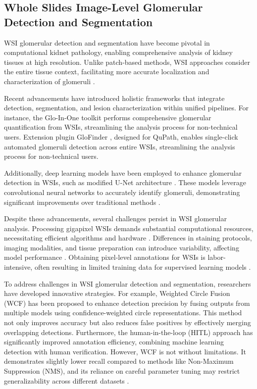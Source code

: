     \subsection{Whole Slides Image-Level Glomerular Detection and Segmentation}

WSI glomerular detection and segmentation have become pivotal in computational kidnet pathology, enabling comprehensive analysis of kidney tissues at high resolution. Unlike patch-based methods, WSI approaches consider the entire tissue context, facilitating more accurate localization and characterization of glomeruli \citep{BUENO2020105273, tang2024holohisto}. 

Recent advancements have introduced holistic frameworks that integrate detection, segmentation, and lesion characterization within unified pipelines. For instance, the Glo-In-One \citep{GloInOne, GloInOne_v2} toolkit performs comprehensive glomerular quantification from WSIs, streamlining the analysis process for non-technical users. Extension plugin GloFinder \citep{GloFinder}, designed for QuPath, enables single-click automated glomeruli detection across entire WSIs, streamlining the analysis process for non-technical users.

Additionally, deep learning models have been employed to enhance glomerular detection in WSIs, such as modified U-Net architecture \citep{jha2021instance}. These models leverage convolutional neural networks to accurately identify glomeruli, demonstrating significant improvements over traditional methods \citep{jha2021instance, JIANG20211431}. 

Despite these advancements, several challenges persist in WSI glomerular analysis. Processing gigapixel WSIs demands substantial computational resources, necessitating efficient algorithms and hardware \citep{BECKER202065}. Differences in staining protocols, imaging modalities, and tissue preparation can introduce variability, affecting model performance \citep{7243333}. Obtaining pixel-level annotations for WSIs is labor-intensive, often resulting in limited training data for supervised learning models \citep{9973240}. 

To address challenges in WSI glomerular detection and segmentation, researchers have developed innovative strategies. For example, Weighted Circle Fusion (WCF) \citep{WCF} has been proposed to enhance detection precision by fusing outputs from multiple models using confidence-weighted circle representations. This method not only improves accuracy but also reduces false positives by effectively merging overlapping detections. Furthermore, the human-in-the-loop (HITL) approach has significantly improved annotation efficiency, combining machine learning detection with human verification. However, WCF is not without limitations. It demonstrates slightly lower recall compared to methods like Non-Maximum Suppression (NMS), and its reliance on careful parameter tuning may restrict generalizability across different datasets \citep{WCF}.